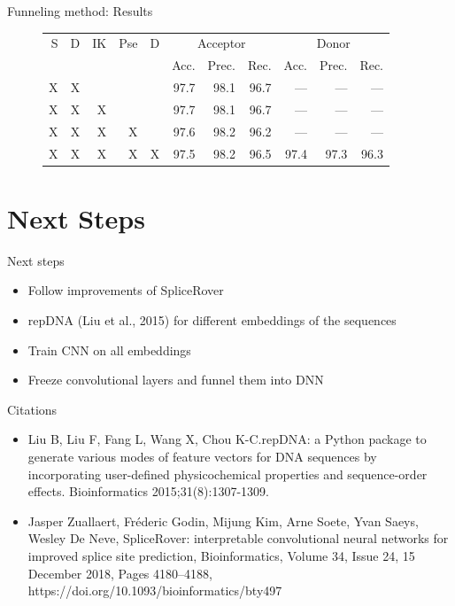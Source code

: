 \documentclass[10pt]{beamer}
\begin{document}
\begin{frame}{Funneling method: Results}
	\begin{figure}
		\footnotesize
		\centering
		\begingroup
		\def\arraystretch{1.2}
		\begin{tabular}{|r|r|r|r|r|r|r|r|r|r|r|}
			\hline
			 S&D & IK & Pse & D & \multicolumn{3}{c|}{Acceptor} & \multicolumn{3}{c|}{Donor} \\
			\cline{6-11}
			&&&&& Acc. & Prec. & Rec. & Acc. & Prec. & Rec. \\
			\hline
			X & X &&& & 97.7 & 98.1 & 96.7 & --- & --- & --- \\
			\hline
			X & X & X & & & 97.7 & 98.1 & 96.7 & --- & --- & --- \\
			\hline
			X & X & X & X & & 97.6 & 98.2 & 96.2 & --- & --- & --- \\
			\hline
			X & X & X & X & X & 97.5 & 98.2 & 96.5 & 97.4 & 97.3 & 96.3 \\
			\hline
			
			
			
			\hline  
		\end{tabular}
		\endgroup
	\end{figure}
\end{frame}

\section{Next Steps}
\begin{frame}{Next steps}
	\begin{itemize}
		\item Follow improvements of SpliceRover
		\item repDNA (Liu et al., 2015) for different embeddings of the sequences
		\item Train CNN on all embeddings
		\item Freeze convolutional layers and funnel them into DNN
	\end{itemize}
\end{frame}

\begin{frame}{Citations}
	\footnotesize
	\begin{itemize}
		\item Liu B, Liu F, Fang L, Wang X, Chou K-C.repDNA: a Python package to generate various modes of feature vectors for DNA sequences by incorporating user-defined physicochemical properties and sequence-order effects. Bioinformatics 2015;31(8):1307-1309.
		\item Jasper Zuallaert, Fréderic Godin, Mijung Kim, Arne Soete, Yvan Saeys, Wesley De Neve, SpliceRover: interpretable convolutional neural networks for improved splice site prediction, Bioinformatics, Volume 34, Issue 24, 15 December 2018, Pages 4180–4188, https://doi.org/10.1093/bioinformatics/bty497
	\end{itemize}
\end{frame}
\end{document}
